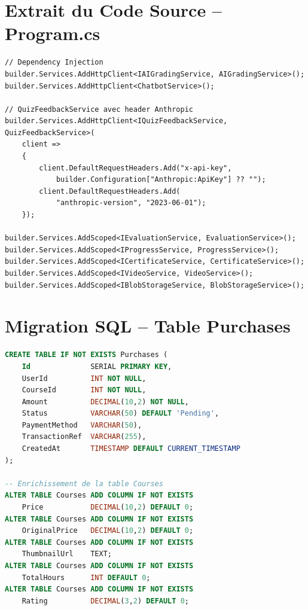 
\chapter{Extrait du Code Source – Program.cs}
\label{ann:program_cs}

\begin{lstlisting}[language={[Sharp]C}, caption={Configuration de l'injection de dépendances (Program.cs)}, label={lst:program}]
// Dependency Injection
builder.Services.AddHttpClient<IAIGradingService, AIGradingService>();
builder.Services.AddHttpClient<ChatbotService>();

// QuizFeedbackService avec header Anthropic
builder.Services.AddHttpClient<IQuizFeedbackService, QuizFeedbackService>(
    client =>
    {
        client.DefaultRequestHeaders.Add("x-api-key",
            builder.Configuration["Anthropic:ApiKey"] ?? "");
        client.DefaultRequestHeaders.Add(
            "anthropic-version", "2023-06-01");
    });

builder.Services.AddScoped<IEvaluationService, EvaluationService>();
builder.Services.AddScoped<IProgressService, ProgressService>();
builder.Services.AddScoped<ICertificateService, CertificateService>();
builder.Services.AddScoped<IVideoService, VideoService>();
builder.Services.AddScoped<IBlobStorageService, BlobStorageService>();
\end{lstlisting}

\chapter{Migration SQL – Table Purchases}
\label{ann:sql_purchases}

\begin{lstlisting}[language=SQL, caption={Migration SQL de création de la table Purchases}, label={lst:sql_purchases}]
CREATE TABLE IF NOT EXISTS Purchases (
    Id              SERIAL PRIMARY KEY,
    UserId          INT NOT NULL,
    CourseId        INT NOT NULL,
    Amount          DECIMAL(10,2) NOT NULL,
    Status          VARCHAR(50) DEFAULT 'Pending',
    PaymentMethod   VARCHAR(50),
    TransactionRef  VARCHAR(255),
    CreatedAt       TIMESTAMP DEFAULT CURRENT_TIMESTAMP
);

-- Enrichissement de la table Courses
ALTER TABLE Courses ADD COLUMN IF NOT EXISTS
    Price           DECIMAL(10,2) DEFAULT 0;
ALTER TABLE Courses ADD COLUMN IF NOT EXISTS
    OriginalPrice   DECIMAL(10,2) DEFAULT 0;
ALTER TABLE Courses ADD COLUMN IF NOT EXISTS
    ThumbnailUrl    TEXT;
ALTER TABLE Courses ADD COLUMN IF NOT EXISTS
    TotalHours      INT DEFAULT 0;
ALTER TABLE Courses ADD COLUMN IF NOT EXISTS
    Rating          DECIMAL(3,2) DEFAULT 0;
\end{lstlisting}

